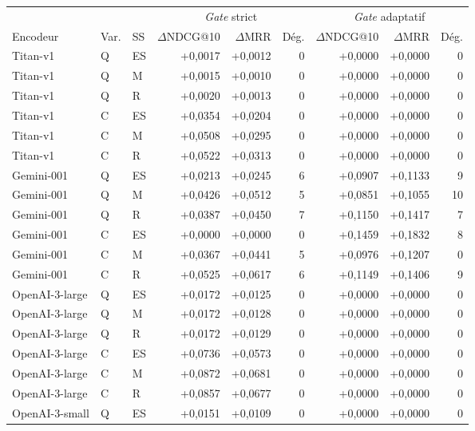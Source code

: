 \documentclass[a4paper,10pt]{article}
\begin{document}
\begin{table}[p]
\centering
\small
\begin{tabular}{lllrrrrrr}
\toprule
 & & & \multicolumn{3}{c}{\textit{Gate} strict} & \multicolumn{3}{c}{\textit{Gate} adaptatif} \\
\cmidrule(lr){4-6}\cmidrule(lr){7-9}
Encodeur & Var. & SS & $\Delta$NDCG@10 & $\Delta$MRR & Dég. & $\Delta$NDCG@10 & $\Delta$MRR & Dég. \\
\midrule
Titan-v1 & Q & ES & +0,0017 & +0,0012 & 0 & +0,0000 & +0,0000 & 0 \\
Titan-v1 & Q & M & +0,0015 & +0,0010 & 0 & +0,0000 & +0,0000 & 0 \\
Titan-v1 & Q & R & +0,0020 & +0,0013 & 0 & +0,0000 & +0,0000 & 0 \\
Titan-v1 & C & ES & +0,0354 & +0,0204 & 0 & +0,0000 & +0,0000 & 0 \\
Titan-v1 & C & M & +0,0508 & +0,0295 & 0 & +0,0000 & +0,0000 & 0 \\
Titan-v1 & C & R & +0,0522 & +0,0313 & 0 & +0,0000 & +0,0000 & 0 \\
\midrule
Gemini-001 & Q & ES & +0,0213 & +0,0245 & 6 & +0,0907 & +0,1133 & 9 \\
Gemini-001 & Q & M & +0,0426 & +0,0512 & 5 & +0,0851 & +0,1055 & 10 \\
Gemini-001 & Q & R & +0,0387 & +0,0450 & 7 & +0,1150 & +0,1417 & 7 \\
Gemini-001 & C & ES & +0,0000 & +0,0000 & 0 & +0,1459 & +0,1832 & 8 \\
Gemini-001 & C & M & +0,0367 & +0,0441 & 5 & +0,0976 & +0,1207 & 0 \\
Gemini-001 & C & R & +0,0525 & +0,0617 & 6 & +0,1149 & +0,1406 & 9 \\
\midrule
OpenAI-3-large & Q & ES & +0,0172 & +0,0125 & 0 & +0,0000 & +0,0000 & 0 \\
OpenAI-3-large & Q & M & +0,0172 & +0,0128 & 0 & +0,0000 & +0,0000 & 0 \\
OpenAI-3-large & Q & R & +0,0172 & +0,0129 & 0 & +0,0000 & +0,0000 & 0 \\
OpenAI-3-large & C & ES & +0,0736 & +0,0573 & 0 & +0,0000 & +0,0000 & 0 \\
OpenAI-3-large & C & M & +0,0872 & +0,0681 & 0 & +0,0000 & +0,0000 & 0 \\
OpenAI-3-large & C & R & +0,0857 & +0,0677 & 0 & +0,0000 & +0,0000 & 0 \\
\midrule
OpenAI-3-small & Q & ES & +0,0151 & +0,0109 & 0 & +0,0000 & +0,0000 & 0 \\

\end{tabular}
\end{table}
\end{document}
